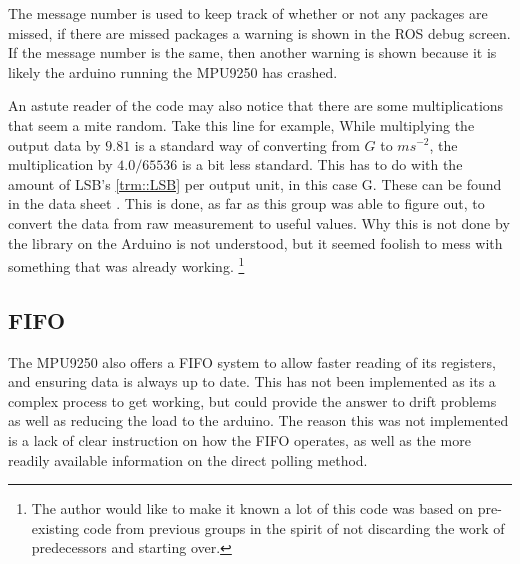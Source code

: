 The message number is used to keep track of whether or not any packages are missed, if there are missed packages a warning is shown in the ROS debug screen.
If the message number is the same, then another warning is shown because it is likely the arduino running the MPU9250 has crashed.

An astute reader of the code may also notice that there are some multiplications that seem a mite random. 
Take this line for example, 
While multiplying the output data by $9.81$ is a standard way of converting from $G$ to $ms^{-2}$, the multiplication by $4.0/65536$ is a bit less standard.
This has to do with the amount of LSB's \ref{trm::LSB} per output unit, in this case G.
These can be found in the data sheet \cite{MPU9250}.
This is done, as far as this group was able to figure out, to convert the data from raw measurement to useful values.
Why this is not done by the library on the Arduino is not understood, but it seemed foolish to mess with something that was already working.
\footnote{The author would like to make it known a lot of this code was based on pre-existing code from previous groups in the spirit of not discarding the work of predecessors and starting over.}

\subsection{FIFO}
The MPU9250 also offers a FIFO system to allow faster reading of its registers, and ensuring data is always up to date.
This has not been implemented as its a complex process to get working, but could provide the answer to drift problems as well as reducing the load to the arduino.
The reason this was not implemented is a lack of clear instruction on how the FIFO operates, as well as the more readily available information on the direct polling method.
\newpage